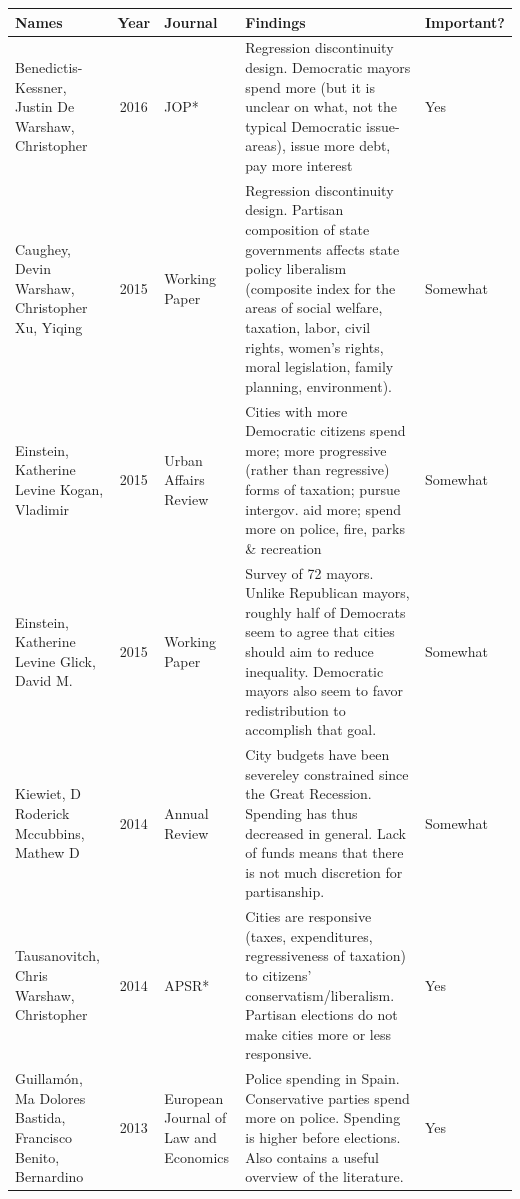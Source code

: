 \documentclass[11pt]{article}
\begin{document}
\begin{landscape}
\begin{table}[htbp]
	\begin{tabular}{|p{2cm}|c|p{3cm}|p{12cm}|l|}
		\hline
		Names & Year & Journal & Findings & Important? \\ \hline
		Benedictis-Kessner, Justin De
		Warshaw, Christopher & 2016 & JOP* & Regression discontinuity design. Democratic mayors spend more (but it is unclear on what, not the typical Democratic issue-areas), issue more debt, pay more interest & Yes \\ \hline
		Caughey, Devin
		Warshaw, Christopher
		Xu, Yiqing & 2015 & Working Paper & Regression discontinuity design. Partisan composition of state governments affects state policy liberalism (composite index for the areas of social welfare, taxation, labor, civil rights, women’s rights, moral legislation, family planning, environment). & Somewhat \\ \hline
		Einstein, Katherine Levine
		Kogan, Vladimir & 2015 & Urban Affairs Review & Cities with more Democratic citizens spend more; more progressive (rather than regressive) forms of taxation; pursue intergov. aid more; spend more on police, fire, parks \& recreation & Somewhat \\ \hline
		Einstein, Katherine Levine
		Glick, David M. & 2015 & Working Paper & Survey of 72 mayors. Unlike Republican mayors, roughly half of Democrats seem to agree that cities should aim to reduce inequality. Democratic mayors also seem to favor redistribution to accomplish that goal. & Somewhat \\ \hline
		Kiewiet, D Roderick
		Mccubbins, Mathew D & 2014 & Annual Review & City budgets have been severeley constrained since the Great Recession. Spending has thus decreased in general. Lack of funds means that there is not much discretion for partisanship. & Somewhat \\ \hline
		Tausanovitch, Chris
		Warshaw, Christopher & 2014 & APSR* & Cities are responsive (taxes, expenditures, regressiveness of taxation) to citizens' conservatism/liberalism. Partisan elections do not make cities more or less responsive. & Yes \\ \hline
		Guillamón, Ma Dolores
		Bastida, Francisco
		Benito, Bernardino & 2013 & European Journal of Law and Economics & Police spending in Spain. Conservative parties spend more on police. Spending is higher before elections. Also contains a useful overview of the literature. & Yes \\ \hline
	\end{tabular}
	\label{}
\end{table}
\end{landscape}
\end{document}
